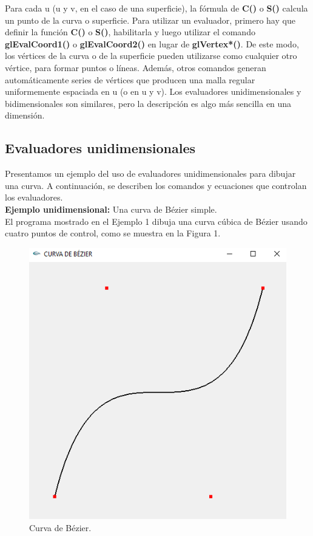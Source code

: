 Para cada u (u y v, en el caso de una superficie), la fórmula de  \textbf{C()} o \textbf{S()} calcula un punto de la curva o superficie. Para utilizar un evaluador, primero hay que definir la función \textbf{C()} o \textbf{S()}, habilitarla y luego utilizar el comando \textbf{glEvalCoord1()} o \textbf{glEvalCoord2()} en lugar de \textbf{glVertex*()}. De este modo, los vértices de la curva o de la superficie pueden utilizarse como cualquier otro vértice, para formar puntos o líneas. Además, otros comandos generan automáticamente series de vértices que producen una malla regular uniformemente espaciada en u (o en u y v). Los evaluadores unidimensionales y bidimensionales son similares, pero la descripción es algo más sencilla en una dimensión.
\subsection{Evaluadores unidimensionales}
Presentamos un ejemplo del uso de evaluadores unidimensionales para dibujar una curva. A continuación, se describen los comandos y ecuaciones que controlan los evaluadores.\\

\textbf{Ejemplo unidimensional:} Una curva de Bézier simple.\\

El programa mostrado en el Ejemplo 1 dibuja una curva cúbica de Bézier usando cuatro puntos de control, como se muestra en la Figura 1.

\begin{figure}[h!]
	\centering
	\includegraphics[width=0.5\linewidth]{figures/CURVA.PNG}
	\caption{Curva de Bézier.}
	\label{fig:propuesta}
\end{figure}
